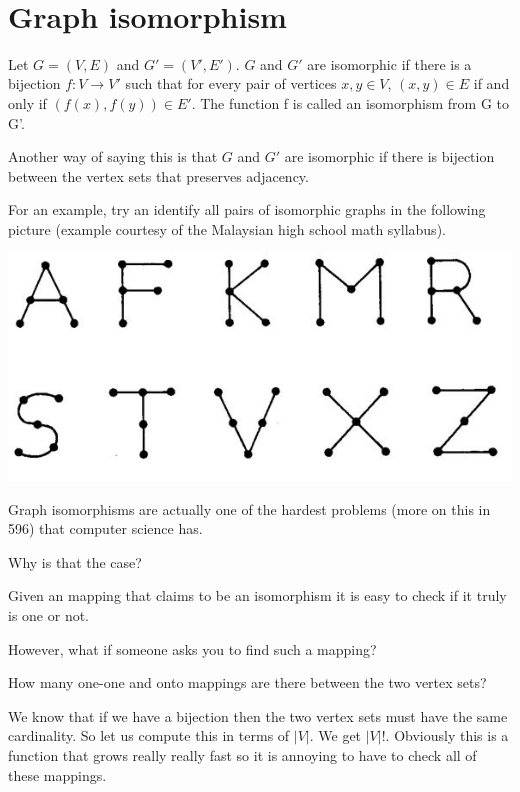 \documentclass[12pt]{article}
\begin{document}
\begin{center}
\\
\vspace{1cm}
\end{center}

\vspace{0.5cm}\noindent


\section*{Graph isomorphism}

Let $G = (V, E)$ and $G'=(V',E')$. $G$ and $G'$ are isomorphic if there is a bijection $f: V \rightarrow V'$ such that for every pair of vertices $x, y \in V$, $(x, y) \in E$ if and only if $(f(x), f(y)) \in E'$. The function f is called an isomorphism from G to G'. 

\medskip

Another way of saying this is that $G$ and $G'$ are isomorphic if there is bijection between the vertex sets that preserves adjacency.

For an example, try an identify all pairs of isomorphic graphs in the following picture (example courtesy of the Malaysian high school math syllabus).


\includegraphics[scale=0.6]{iso.jpg}

Graph isomorphisms are actually one of the hardest problems (more on this in 596) that computer science has.

Why is that the case?

Given an mapping that claims to be an isomorphism it is easy to check if it truly is one or not.

However, what if someone asks you to find such a mapping?

How many one-one and onto mappings are there between the two vertex sets? 

We know that if we have a bijection then the two vertex sets must have the same cardinality. So let us compute this in terms of $|V|$. We get $|V|!$. Obviously this is a function that grows really really fast so it is annoying to have to check all of these mappings.
\end{document}
